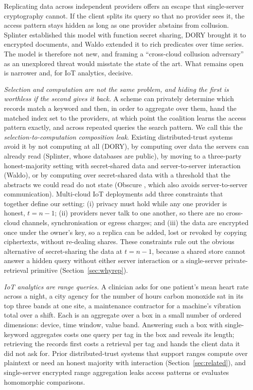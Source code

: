\documentclass[a4paper,fleqn]{cas-sc}
\begin{document}
Replicating data across independent providers offers an escape that
single-server cryptography cannot. If the client splits its query so that no
provider sees it, the access pattern stays hidden as long as one provider
abstains from collusion. Splinter \citep{splinter} established this model with
function secret sharing, DORY \citep{dory} brought it to encrypted documents,
and Waldo \citep{waldo} extended it to rich predicates over time series. The
model is therefore not new, and framing a ``cross-cloud collusion adversary''
as an unexplored threat would misstate the state of the art. What remains open
is narrower and, for IoT analytics, decisive.

\emph{Selection and computation are not the same problem, and hiding the first
is worthless if the second gives it back.} A scheme can privately determine
which records match a keyword and then, in order to aggregate over them, hand
the matched index set to the providers, at which point the coalition learns
the access pattern exactly, and across repeated queries the search pattern. We
call this the \emph{selection-to-computation composition leak}. Existing
distributed-trust systems avoid it by not computing at all (DORY), by
computing over data the servers can already read (Splinter, whose databases
are public), by moving to a three-party honest-majority setting with
secret-shared data and server-to-server interaction (Waldo), or by computing
over secret-shared data with a threshold that the abstracts we could read do
not state (Obscure \citep{gupta2019obscure,gupta2020obscure}, which also
avoids server-to-server communication). Multi-cloud IoT deployments add three
constraints that together define our setting: (i) privacy must hold while any
one provider is honest, $t=n-1$; (ii) providers never talk to one another, so
there are no cross-cloud channels, synchronisation or egress charges; and
(iii) the data are encrypted once under the owner's key, so a replica can be
added, lost or revoked by copying ciphertexts, without re-dealing shares.
These constraints rule out the obvious alternative of secret-sharing the data
at $t=n-1$, because a shared store cannot answer a hidden query without either
server interaction or a single-server private-retrieval primitive
(Section~\ref{sec:whyrep}).

\emph{IoT analytics are range queries.} A clinician asks for one patient's
mean heart rate across a night, a city agency for the number of hours carbon
monoxide sat in its top three bands at one site, a maintenance contractor for a
machine's vibration total over a shift. Each is an aggregate over a box in a
small number of ordered dimensions: device, time window, value band. Answering
such a box with single-keyword aggregates costs one query per tag in the box
and reveals its length; retrieving the records first costs a retrieval per tag
and hands the client data it did not ask for. Prior distributed-trust systems
that support ranges compute over plaintext or need an honest majority with
interaction (Section~\ref{sec:related}), and single-server encrypted range
aggregation leaks access patterns or evaluates homomorphic comparisons.
\end{document}
